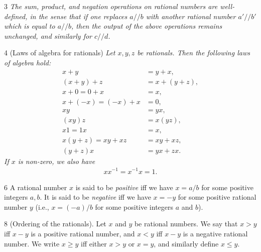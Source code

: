 \begin{lemma}{3}
    \label{rat-ops-well-defined}
    \emph{The sum, product, and negation operations on rational numbers are well-defined, in the sense that if one
    replaces $a // b$ with another rational number $a' // b'$ which is equal to $a // b$, then the output of the above
    operations remains unchanged, and similarly for $c // d$.}
\end{lemma}

\begin{proposition}{4}
    \label{rat-algebra-laws}
    (Laws of algebra for rationals) \emph{Let $x, y, z$ be rationals. Then the following laws of algebra hold:
    \begin{align*}
        x + y &= y + x,\\
        (x + y) + z &= x + (y + z),\\
        x + 0 = 0 + x &= x,\\
        x + (-x) = (-x) + x &= 0,\\
        xy &= yx,\\
        (xy)z &= x(yz),\\
        x1 = 1x &= x,\\
        x(y + z) = xy + xz &= xy + xz,\\
        (y + z)x &= yx + zx.
    \end{align*}
    If $x$ is non-zero, we also have
    \begin{align*}
        xx^{-1} = x^{-1}x = 1.
    \end{align*}
    }
\end{proposition}

\begin{definition}{6}
    \label{rat-positive}
    A rational number $x$ is said to be \emph{positive} iff we have $x = a/b$ for some positive integers $a, b$.
    It is said to be \emph{negative} iff we have $x = -y$ for some positive rational number $y$ (i.e., $x = (-a)/b$
    for some positive integers $a$ and $b$).
\end{definition}

\begin{definition}{8}
    \label{rat-order}
    (Ordering of the rationals). Let $x$ and $y$ be rational numbers. We say that $x > y$ iff $x - y$ is a positive
    rational number, and $x < y$ iff $x - y$ is a negative rational number. We write $x \geq y$ iff either $x > y$ or
    $x = y$, and similarly define $x \leq y$.
\end{definition}

